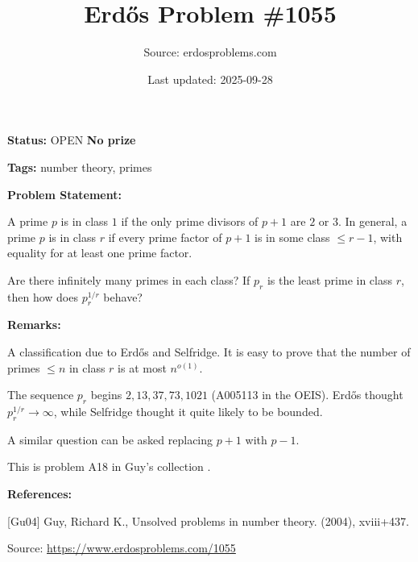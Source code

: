 \documentclass{article}
\title{Erd\H{o}s Problem \#1055}
\date{Last updated: 2025-09-28}
\author{Source: erdosproblems.com}
\begin{document}
\maketitle

\noindent\textbf{Status:} OPEN \quad \textbf{No prize}

\noindent\textbf{Tags:} number theory, primes

\medskip
\noindent\textbf{Problem Statement:}

A prime $p$ is in class $1$ if the only prime divisors of $p+1$ are $2$ or $3$. In general, a prime $p$ is in class $r$ if every prime factor of $p+1$ is in some class $\leq r-1$, with equality for at least one prime factor.

Are there infinitely many primes in each class? If $p_r$ is the least prime in class $r$, then how does $p_r^{1/r}$ behave?

\bigskip
\noindent\textbf{Remarks:}

A classification due to Erd\H{o}s and Selfridge. It is easy to prove that the number of primes $\leq n$ in class $r$ is at most $n^{o(1)}$. 

The sequence $p_r$ begins $2,13,37,73,1021$ (A005113 in the OEIS). Erd\H{o}s thought $p_r^{1/r}\to \infty$, while Selfridge thought it quite likely to be bounded.

A similar question can be asked replacing $p+1$ with $p-1$.

This is problem A18 in Guy's collection \cite{Gu04}.

\bigskip
\noindent\textbf{References:}

[Gu04] Guy, Richard K., Unsolved problems in number theory. (2004), xviii+437.

\bigskip
\noindent\small{Source: \url{https://www.erdosproblems.com/1055}}
\end{document}
